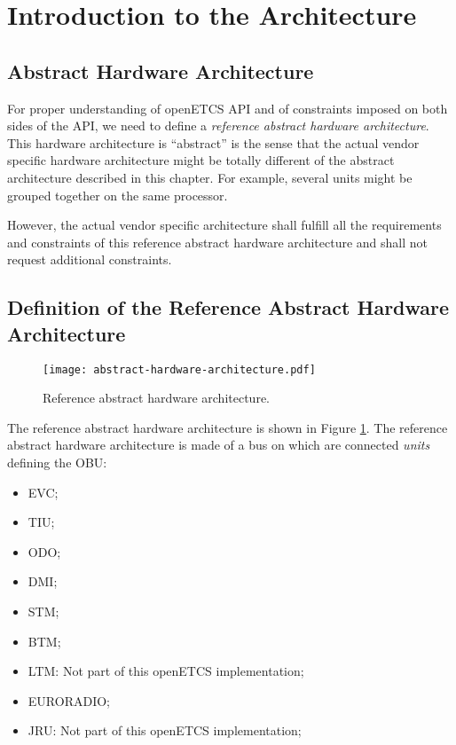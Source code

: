 
\section{Introduction to the Architecture}

\subsection{Abstract Hardware Architecture}

For proper understanding of openETCS API and of constraints imposed on
both sides of the API, we need to define a \emph{reference abstract hardware architecture}. This hardware architecture is ``abstract''
is the sense that the actual vendor specific hardware architecture
might be totally different of the abstract architecture described in
this chapter. For example, several units might be grouped together on
the same processor.

However, the actual vendor specific architecture shall fulfill all the
requirements and constraints of this reference abstract hardware
architecture and shall not request additional constraints.

\subsection{Definition of the Reference Abstract Hardware Architecture}

\begin{figure}
  \centering
  \texttt{[image: abstract-hardware-architecture.pdf]}
  \caption{Reference abstract hardware architecture.}
  \label{fig:hardware-arch}
\end{figure}

The reference abstract hardware architecture is shown in Figure
\ref{fig:hardware-arch}. The reference abstract hardware architecture is made of a bus on which are connected \emph{units} defining the OBU:
\begin{itemize}
\item {EVC};
\item {TIU};
\item {ODO};
\item {DMI};
\item {STM};
\item {BTM};
\item {LTM}: Not part of this openETCS implementation;
\item EURORADIO;
\item {JRU}: Not part of this openETCS implementation;
\end{itemize}

